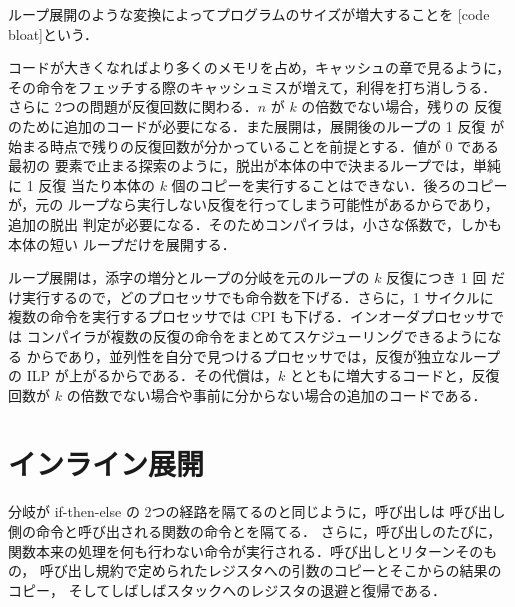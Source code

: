 \documentclass[../main.tex]{subfiles}
\begin{document}
\begin{definition}[コード肥大化]
  \label{def:l10-bloat}
  ループ展開のような変換によってプログラムのサイズが増大することを
  [code bloat]という．
\end{definition}

コードが大きくなればより多くのメモリを占め，キャッシュの章で見るように，
その命令をフェッチする際のキャッシュミスが増えて，利得を打ち消しうる．
%
さらに 2つの問題が反復回数に関わる．$n$ が $k$ の倍数でない場合，残りの
反復のために追加のコードが必要になる．また展開は，展開後のループの 1 反復
が始まる時点で残りの反復回数が分かっていることを前提とする．値が 0 である最初の
要素で止まる探索のように，脱出が本体の中で決まるループでは，単純に 1 反復
当たり本体の $k$ 個のコピーを実行することはできない．後ろのコピーが，元の
ループなら実行しない反復を行ってしまう可能性があるからであり，追加の脱出
判定が必要になる．そのためコンパイラは，小さな係数で，しかも本体の短い
ループだけを展開する．

\begin{keypoint}
  ループ展開は，添字の増分とループの分岐を元のループの $k$ 反復につき 1 回
  だけ実行するので，どのプロセッサでも命令数を下げる．さらに，1 サイクルに
  複数の命令を実行するプロセッサでは CPI も下げる．インオーダプロセッサでは
  コンパイラが複数の反復の命令をまとめてスケジューリングできるようになる
  からであり，並列性を自分で見つけるプロセッサでは，反復が独立なループの
  ILP が上がるからである．その代償は，$k$ とともに増大するコードと，反復
  回数が $k$ の倍数でない場合や事前に分からない場合の追加のコードである．
\end{keypoint}

\section{インライン展開}
\label{sec:l10-inlining}

分岐が if-then-else の 2つの経路を隔てるのと同じように，呼び出しは
呼び出し側の命令と呼び出される関数の命令とを隔てる．
さらに，呼び出しのたびに，
関数本来の処理を何も行わない命令が実行される．呼び出しとリターンそのもの，
呼び出し規約で定められたレジスタへの引数のコピーとそこからの結果のコピー，
そしてしばしばスタックへのレジスタの退避と復帰である．
\end{document}
